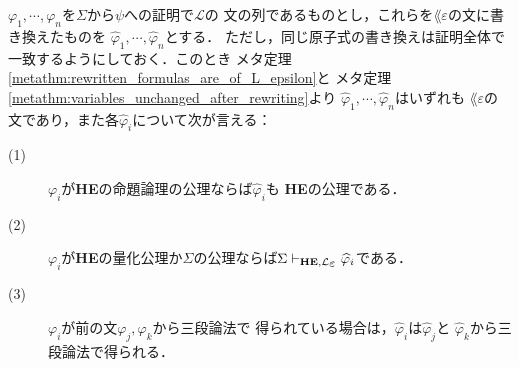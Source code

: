 	\begin{metaprf}
		$\varphi_{1},\cdots,\varphi_{n}$を$\Sigma$から$\psi$への証明で$\mathcal{L}$の
		文の列であるものとし，これらを$\lang{\varepsilon}$の文に書き換えたものを
		$\widehat{\varphi}_{1},\cdots,\widehat{\varphi}_{n}$とする．
		ただし，同じ原子式の書き換えは証明全体で一致するようにしておく．このとき
		メタ定理\ref{metathm:rewritten_formulas_are_of_L_epsilon}と
		メタ定理\ref{metathm:variables_unchanged_after_rewriting}より
		$\widehat{\varphi}_{1},\cdots,\widehat{\varphi}_{n}$はいずれも
		$\lang{\varepsilon}$の文であり，また各$\widehat{\varphi}_{i}$について次が言える：
		\begin{description}
			\item[(1)] $\varphi_{i}$が{\bf HE}の命題論理の公理ならば$\widehat{\varphi}_{i}$も
				{\bf HE}の公理である．
				
			\item[(2)] $\varphi_{i}$が{\bf HE}の量化公理か$\Sigma$の公理ならば$\Sigma 
				\provable{\mbox{{\bf HE}},\lang{\varepsilon}} \widehat{\varphi}_{i}$である．
				
			\item[(3)] $\varphi_{i}$が前の文$\varphi_{j},\varphi_{k}$から三段論法で
				得られている場合は，$\widehat{\varphi}_{i}$は$\widehat{\varphi}_{j}$と
				$\widehat{\varphi}_{k}$から三段論法で得られる．
		\end{description}
		

\end{metaprf}
